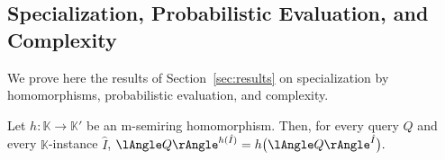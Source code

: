 \begin{toappendix}
\subsection{Specialization, Probabilistic Evaluation, and Complexity}
We prove here the results of Section~\ref{sec:results} on specialization
by homomorphisms, probabilistic evaluation, and complexity.
\end{toappendix}
\begin{propositionrep}\label{prop:hom}
  Let $h:\mathbb K\to\mathbb K'$ be an m-semiring homomorphism. Then, for
  every  query $Q$
  and every $\mathbb K$-instance $\hat I$,
  \(
    \angsem{h(\hat I)}{Q}=h\bigl(\angsem{\hat I}{Q}\bigr).
  \)
\end{propositionrep}

